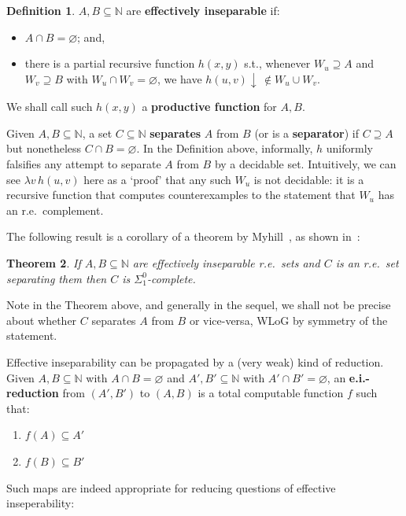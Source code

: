 \documentclass[a4paper,10pt]{amsart}
\renewcommand{\emptyset}{\varnothing}
\newtheorem{theorem}{Theorem}
\theoremstyle{definition}
\newtheorem{definition}[theorem]{Definition}
\newcommand{\Nat}{\mathbb{N}}
\newcommand{\N}{\mathbb N}
\newcommand{\res}[1]{W_{#1}}
\begin{document}
\begin{definition}
$A,B\subseteq \N$ are \textbf{effectively inseparable} if:
\begin{itemize}
    \item $A \cap B = \emptyset$; and,
    \item there is a partial recursive function $h(x,y)$ s.t., whenever $\res u \supseteq A$ and $\res v \supseteq B$ with $\res u \cap \res v = \emptyset$, we have $h(u,v) \downarrow\,  \notin \res u \cup \res v$. 
\end{itemize}
We shall call such $h(x,y)$ a \textbf{productive function} for $A,B$.
\end{definition}


Given $A,B \subseteq \N$, a set $C\subseteq \N $ \textbf{separates} $A$ from $B$ (or is a \textbf{separator}) if $C\supseteq A$ but nonetheless $C\cap B = \emptyset$. 
In the Definition above, informally, $h$ uniformly falsifies any attempt to separate $A$ from $B$ by a decidable set.
Intuitively, we can see $\lambda v\,  h(u,v)$ here as a `proof' that any such $\res u$ is not decidable: it is a recursive function that computes counterexamples to the statement that $\res u$ has an r.e.\ complement.

The following result is a corollary of a theorem by Myhill~\cite{Myhill1955}, as shown in~\cite[Exercise 11-14]{Rogers1987}:
\begin{theorem}
\label{separator-of-eff-insep-sets-is-S01-complete}
If $A,B \subseteq \N $ are effectively inseparable r.e.\ sets and $C$ is an r.e.\ set separating them then $C$ is $\Sigma^0_1$-complete.
\end{theorem}

Note in the Theorem above, and generally in the sequel, we shall not be precise about whether $C$ separates $A$ from $B$ or vice-versa, WLoG by symmetry of the statement.


Effective inseparability can be propagated by a (very weak) kind of reduction.
Given $A,B\subseteq \Nat$ with $A\cap B = \emptyset$ and $A', B'\subseteq \Nat$ with $A' \cap B' = \emptyset$, an \textbf{e.i.-reduction} from $(A',B')$ to $(A,B)$ is a total computable function $f$ such that: 
\begin{enumerate}
\item\label{item:f(A)-in-A'} $f(A) \subseteq A'$
\item\label{item:f(B)-in-B'} $f(B) \subseteq B'$
\end{enumerate}
Such maps are indeed appropriate for reducing questions of effective inseperability:
\end{document}
